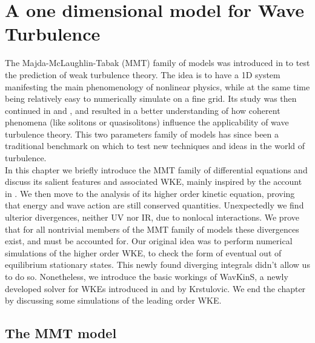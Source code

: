 

\newpage
\phantom{}
\thispagestyle{empty}
\section{A one dimensional model for Wave Turbulence}
    The Majda-McLaughlin-Tabak (MMT) family of models was introduced in \cite{Majda1997} to test the prediction of weak turbulence theory. The idea is to have a 1D system manifesting
    the main phenomenology of nonlinear physics, while at the same time being relatively easy to numerically simulate on a fine grid. Its study was then continued in
    \cite{Cai2001} and \cite{Zakharov2001}, and resulted in a better understanding of how coherent phenomena (like solitons or quasisolitons) influence the applicability 
    of wave turbulence theory. This two parameters family of models has since been a traditional benchmark on which to test new techniques and ideas in the world of turbulence. \\
    In this chapter we briefly introduce the MMT family of differential equations and discuss its salient features and associated WKE, mainly inspired by the account in 
    \cite{ZAKHAROV2004}. We then 
    move to the analysis of its higher order kinetic equation, proving that energy and wave action are still conserved quantities. Unexpectedly  we find 
    ulterior divergences, neither UV nor IR, due to nonlocal interactions. We prove that for all nontrivial members of the MMT family of
    models these divergences exist, and must be accounted for. Our original idea was to perform numerical simulations of the higher order WKE, to check the form of eventual out of equilibrium stationary states. This newly found diverging integrals didn't allow us to do so. Nonetheless, we introduce the basic workings of WavKinS,
    a newly developed solver for WKEs introduced in \cite{Giorgio1} and \cite{Giorgio2} by Krstulovic. We end the chapter by discussing some simulations of the leading order WKE. 
    \newpage  
    \vphantom{a}
    \subsection{The MMT model}

